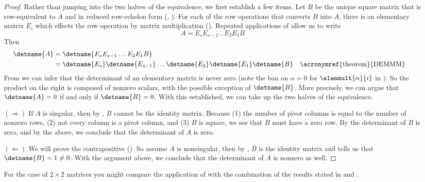 \begin{proof}
Rather than jumping into the two halves of the equivalence, we first establish a few items.  Let $B$ be the unique square matrix that is row-equivalent to $A$ and in reduced row-echelon form (, ).  For each of the row operations that converts $B$ into $A$, there is an elementary matrix $E_i$ which effects the row operation by matrix multiplication ().  Repeated applications of  allow us to write
%
\begin{equation*}
A=E_sE_{s-1}\dots E_2E_1B
\end{equation*}
%
Then
%
\begin{align*}
\detname{A}
&=
\detname{E_sE_{s-1}\dots E_2E_1B}\\
%
&=\detname{E_s}\detname{E_{s-1}}\dots\detname{E_2}\detname{E_1}\detname{B}
&&\text{\acronymref{theorem}{DEMMM}}
%
\end{align*}
%
From  we can infer that the determinant of an elementary matrix is never zero (note the ban on $\alpha=0$ for $\elemmult{\alpha}{i}$ in ).  So the product on the right is composed of nonzero scalars, with the possible exception of $\detname{B}$.  More precisely, we can argue that $\detname{A}=0$ if and only if $\detname{B}=0$.  With this established, we can take up the two halves of the equivalence.\par
%
$(\Rightarrow)$\quad 
If $A$ is singular, then by , $B$ cannot be the identity matrix.  Because (1) the number of pivot columns is equal to the number of nonzero rows, (2) not every column is a pivot column, and (3) $B$ is square, we see that $B$ must have a zero row.  By  the determinant of $B$ is zero, and by the above, we conclude that the determinant of $A$ is zero.\par
%
$(\Leftarrow)$\quad 
We will prove the contrapositive ().  So assume $A$ is nonsingular, then by  , $B$ is the identity matrix and  tells us that $\detname{B}=1\neq 0$.  With the argument above, we conclude that the determinant of $A$ is nonzero as well.
%
\end{proof}
%
For the case of $2\times 2$ matrices you might compare the application of  with the combination of the results stated in  and .
%

